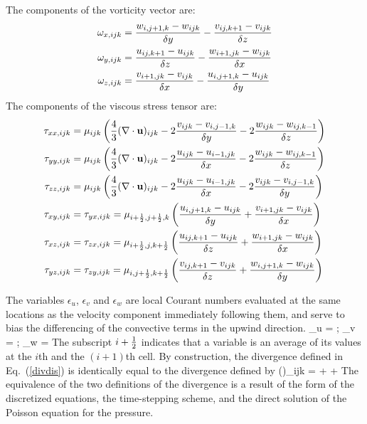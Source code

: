 \documentclass[11pt]{book}
\begin{document}
\noindent The components of the vorticity vector are:
\begin{align}
\omega_{x,ijk} &= \frac{w_{i,j+1,k}-w_{ijk}}{\delta y} -
             \frac{v_{ij,k+1}-v_{ijk}}{ \delta z}  \\
\omega_{y,ijk} &= \frac{u_{ij,k+1}-u_{ijk}}{\delta z} -
             \frac{w_{i+1,jk}-w_{ijk}}{\delta x}  \\
\omega_{z,ijk} &= \frac{v_{i+1,jk}- v_{ijk}}{\delta x} -
             \frac{u_{i,j+1,k}-u_{ijk}}{ \delta y}
\end{align}
\noindent The components of the viscous stress tensor are:
\begin{align}
\tau_{xx,ijk} &= \mu_{ijk} \left( \frac{4}{3} (\nabla \cdot {\bf u})_{ijk} - 2 \frac{v_{ijk}-v_{i,j-1,k}}{\delta y} - 2 \frac{w_{ijk}-w_{ij,k-1}}{\delta z} \right)  \\
\tau_{yy,ijk} &= \mu_{ijk} \left( \frac{4}{3} (\nabla \cdot {\bf u})_{ijk} - 2 \frac{u_{ijk}-u_{i-1,jk}}{\delta x}  - 2 \frac{w_{ijk}-w_{ij,k-1}}{\delta z} \right)  \\
\tau_{zz,ijk} &= \mu_{ijk} \left( \frac{4}{3} (\nabla \cdot {\bf u})_{ijk} - 2 \frac{u_{ijk}-u_{i-1,jk}}{\delta x}  - 2 \frac{v_{ijk}-v_{i,j-1,k}}{\delta y} \right)  \\
\tau_{xy,ijk} &= \tau_{yx,ijk}
        = \mu_{i+\frac{1}{2},j+\frac{1}{2},k} \left( \frac{u_{i,j+1,k}-u_{ijk}}{\delta y}
                         + \frac{v_{i+1,jk} -v_{ijk}}{\delta x} \right) \\
\tau_{xz,ijk} &= \tau_{zx,ijk}
        =\mu_{i+\frac{1}{2},j,k+\frac{1}{2}} \left( \frac{u_{ij,k+1}-u_{ijk}}{\delta z}
                        + \frac{w_{i+1,jk}-w_{ijk}}{\delta x} \right) \\
\tau_{yz,ijk} &= \tau_{zy,ijk}
        =\mu_{i,j+\frac{1}{2},k+\frac{1}{2}} \left( \frac{v_{ij,k+1}-v_{ijk}}{\delta z}
                        + \frac{w_{i,j+1,k}-w_{ijk}}{\delta y} \right)
\end{align}

\noindent The variables $\epsilon_u$, $\epsilon_v$ and $\epsilon_w$ are local
Courant numbers evaluated at the same locations as the velocity component
immediately following them, and serve to bias the differencing of
the convective terms in the upwind direction.
\be
\epsilon_u =  \quad ; \quad \epsilon_v =  \quad ; \quad \epsilon_w = 
\ee
The subscript $i+\frac{1}{2}$ indicates that a variable is an average of its
values at the $i$th and the $(i+1)$th cell.
By construction, the divergence defined in Eq.~(\ref{divdis})
is identically equal to the divergence defined by
\be (\nabla \cdot \bu)_{ijk} =  +
                                +
                                  \ee
The equivalence of the two definitions of the divergence is a result
of the form of the discretized equations, the time-stepping scheme, and
the direct solution of the Poisson equation for the pressure.
\end{document}
